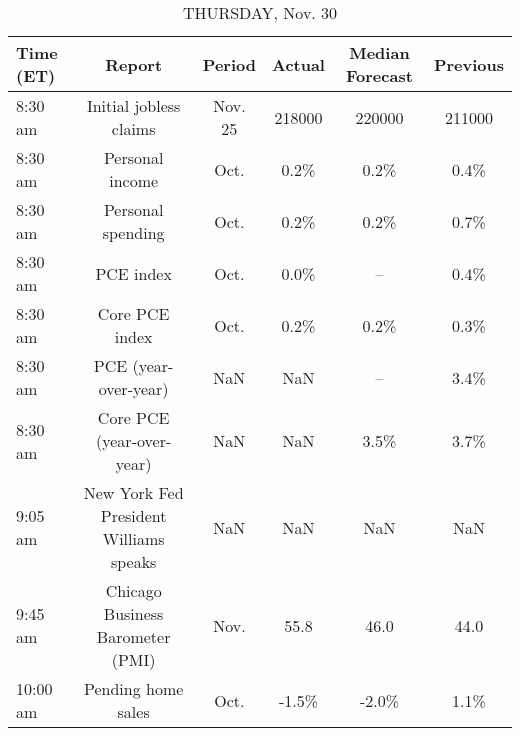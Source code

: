 \documentclass{article}%
\begin{document}
\begin{table}[htbp]%
\caption{THURSDAY, Nov. 30}%
\centering%
\begin{adjustbox}{width=1\textwidth}%
\begin{tabular}{lccccc}
\toprule
Time (ET) &                                 Report &  Period & Actual & Median Forecast & Previous \\
\midrule
  8:30 am &                 Initial jobless claims & Nov. 25 & 218000 &          220000 &   211000 \\
  8:30 am &                        Personal income &    Oct. &   0.2\% &            0.2\% &     0.4\% \\
  8:30 am &                      Personal spending &    Oct. &   0.2\% &            0.2\% &     0.7\% \\
  8:30 am &                              PCE index &    Oct. &   0.0\% &              -- &     0.4\% \\
  8:30 am &                         Core PCE index &    Oct. &   0.2\% &            0.2\% &     0.3\% \\
  8:30 am &                   PCE (year-over-year) &     NaN &    NaN &              -- &     3.4\% \\
  8:30 am &              Core PCE (year-over-year) &     NaN &    NaN &            3.5\% &     3.7\% \\
  9:05 am & New York Fed President Williams speaks &     NaN &    NaN &             NaN &      NaN \\
  9:45 am &       Chicago Business Barometer (PMI) &    Nov. &   55.8 &            46.0 &     44.0 \\
 10:00 am &                     Pending home sales &    Oct. &  -1.5\% &           -2.0\% &     1.1\% \\
\bottomrule
\end{tabular}
%
\end{adjustbox}%
\end{table}

%
\end{document}
